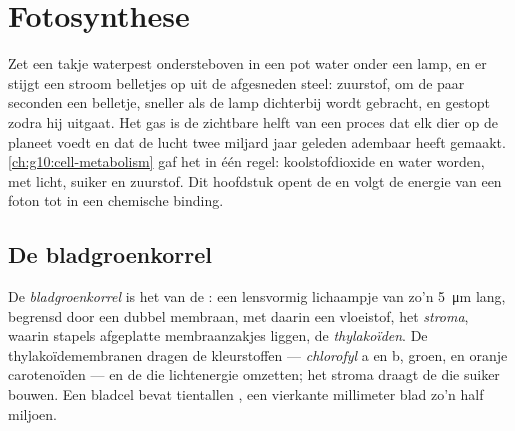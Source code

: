 \chapter{Fotosynthese}\label{ch:g12:photosynthesis}

Zet een takje waterpest ondersteboven in een pot water onder een lamp, en
er stijgt een stroom belletjes op uit de afgesneden steel: zuurstof, om de
paar seconden een belletje, sneller als de lamp dichterbij wordt gebracht,
en gestopt zodra hij uitgaat. Het gas is de zichtbare helft van een proces
dat elk dier op de planeet voedt en dat de lucht twee miljard jaar geleden
adembaar heeft gemaakt. \cref{ch:g10:cell-metabolism} gaf het in één
regel: koolstofdioxide en water worden, met licht, suiker en zuurstof. Dit
hoofdstuk opent de  en volgt de energie van een foton tot
in een chemische binding.

\section{De bladgroenkorrel}

\begin{definition}[Bladgroenkorrel]\label{def:g12:photosynthesis:chloroplast}
De \emph{bladgroenkorrel} is het  van de
: een lensvormig lichaampje van zo'n \qty{5}{\micro m} lang,
begrensd door een dubbel membraan, met daarin een vloeistof, het
\emph{stroma}, waarin stapels afgeplatte membraanzakjes liggen, de
\emph{thylakoïden}. De thylakoïdemembranen dragen de
kleurstoffen --- \emph{chlorofyl} a en b, groen, en oranje carotenoïden
--- en de  die lichtenergie omzetten; het stroma draagt de 
die suiker bouwen. Een bladcel bevat tientallen , een
vierkante millimeter blad zo'n half miljoen.
\end{definition}

